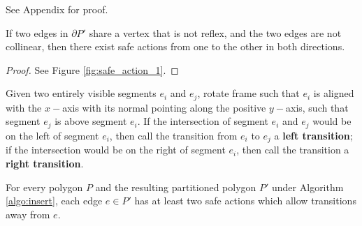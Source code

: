 \documentclass[]{styles/svproc}  %
\begin{document}
See Appendix for proof.

\begin{corollary} \label{coro:neighbor}
If two edges in $\partial P'$ share a vertex that is not reflex, and the two
 edges are not collinear, then there exist safe actions
from one to the other in both directions.
\end{corollary}

\begin{proof}
See Figure \ref{fig:safe_action_1}.
\end{proof}

\begin{definition}
Given two entirely visible segments $e_i$ and $e_j$,
rotate frame such that $e_i$ is aligned with the $x-$axis with its normal pointing
along the positive $y-$axis, such that 
segment $e_j$ is above segment $e_i$. If the intersection of segment $e_i$ and
$e_j$ would be on the left of segment $e_i$, then call the transition from $e_i$ to $e_j$ a
\textbf{left
transition}; if the intersection would be on the right of segment $e_i$, then call the
transition a \textbf{right transition}.
\end{definition}

\begin{proposition} \label{prop:twosafe}
For every polygon $P$ and the resulting partitioned polygon $P'$ under Algorithm
\ref{algo:insert}, each edge $e \in P'$ has at least two safe actions which allow
transitions away from $e$.
\end{proposition}
\end{document}
